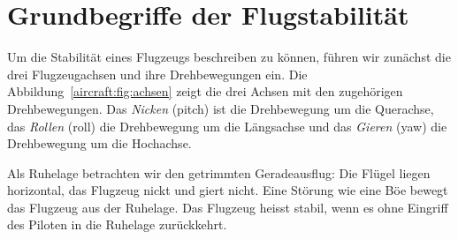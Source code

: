 %
%
%
%


\section{Grundbegriffe der Flugstabilität
\label{aircraft:section:1-grundbegriffe}}
Um die Stabilität eines Flugzeugs beschreiben zu können, führen wir zunächst
die drei Flugzeugachsen und ihre Drehbewegungen ein.
Die Abbildung~\ref{aircraft:fig:achsen} zeigt die drei Achsen mit den
zugehörigen Drehbewegungen.
Das \emph{Nicken} (pitch) ist die Drehbewegung um die Querachse, das
\emph{Rollen} (roll) die Drehbewegung um die Längsachse und das \emph{Gieren}
%
%
%
(yaw) die Drehbewegung um die Hochachse.

Als Ruhelage betrachten wir den getrimmten Geradeausflug:
Die Flügel liegen horizontal, das Flugzeug nickt und giert nicht.
Eine Störung wie eine Böe bewegt das Flugzeug aus der Ruhelage.
Das Flugzeug heisst stabil, wenn es ohne Eingriff des Piloten in die
Ruhelage zurückkehrt.

